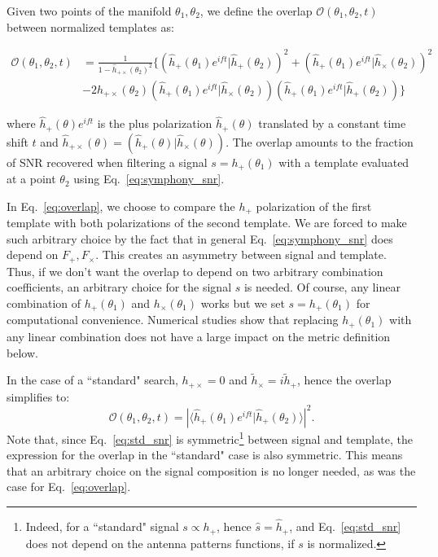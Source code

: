 \documentclass[twocolumn,showpacs,preprintnumbers,nofootinbib,prd,
superscriptaddress,10pt]{revtex4-2}
\newcommand{\scalar}[2]{\langle #1|#2 \rangle}
\newcommand{\rescalar}[2]{( #1 |#2 )}
\newcommand{\rescalarwide}[2]{\left( #1 \lvert #2 \right)}
\begin{document}
Given two points of the manifold $\theta_1,\theta_2$, we define the overlap $\mathcal{O}(\theta_1,\theta_2, t)$ between normalized templates as:
\begin{widetext}
	\begin{align}\label{eq:overlap}
		\mathcal{O}(\theta_1,\theta_2, t) &= \frac{1}{1- \hat{h}_{+\times}(\theta_2)^2} 
		\biggl\{ \rescalarwide{\hat{h}_+(\theta_1)e^{i ft}}{\hat{h}_+(\theta_2)}^2 + \rescalarwide{\hat{h}_+(\theta_1)e^{i ft}}{\hat{h}_\times(\theta_2)}^2 \nonumber \\
		& -2h_{+\times}(\theta_2)\rescalarwide{\hat{h}_+(\theta_1)e^{i ft}}{\hat{h}_\times(\theta_2)}\rescalarwide{\hat{h}_+(\theta_1)e^{i ft}}{\hat{h}_+(\theta_2)} \biggl\}
	\end{align}
\end{widetext}
where $\hat{h}_+(\theta)e^{i ft}$ is the plus polarization $\hat{h}_+(\theta)$ translated by a constant time shift $t$ and $\hat{h}_{+\times}(\theta) = \rescalar{\hat{h}_+(\theta)}{\hat{h}_\times(\theta)}$.
The overlap amounts to the fraction of SNR recovered when filtering a signal $s=h_+(\theta_1)$ with a template evaluated at a point $\theta_2$ using Eq.~\eqref{eq:symphony_snr}.

In Eq.~\eqref{eq:overlap}, we choose to compare the $h_+$ polarization of the first template with both polarizations of the second template. We are forced to make such arbitrary choice by the fact that in general Eq.~\eqref{eq:symphony_snr} does depend on $F_+, F_\times$.
This creates an asymmetry between signal and template.
Thus, if we don't want the overlap to depend on two arbitrary combination coefficients, an arbitrary choice for the signal $s$ is needed.
Of course, any linear combination of $h_+(\theta_1)$ and $h_\times(\theta_1)$ works but we set $s = h_+(\theta_1)$ for computational convenience. Numerical studies show that replacing $h_+(\theta_1)$ with any linear combination does not have a large impact on the metric definition below.

In the case of a ``standard" search, $h_{+\times} = 0$ and ${\tilde{h}_\times = i \tilde{h}_+}$, hence the overlap simplifies to:
\begin{equation}\label{eq:overlap_NP}
\mathcal{O}(\theta_1,\theta_2, t) = \left|\scalar{\hat{h}_+(\theta_1)e^{i ft}}{\hat{h}_+(\theta_2)} \right|^2.
\end{equation}
Note that, since Eq.~\eqref{eq:std_snr} is symmetric\footnote{Indeed, for a ``standard" signal $s \propto h_+$, hence $\hat{s} = \hat{h}_+$, and Eq.~\eqref{eq:std_snr} does not depend on the antenna patterns functions, if $s$ is normalized.} between signal and template, the expression for the overlap in the ``standard" case is also symmetric. This means that an arbitrary choice on the signal composition is no longer needed, as was the case for Eq.~\eqref{eq:overlap}.
\end{document}
